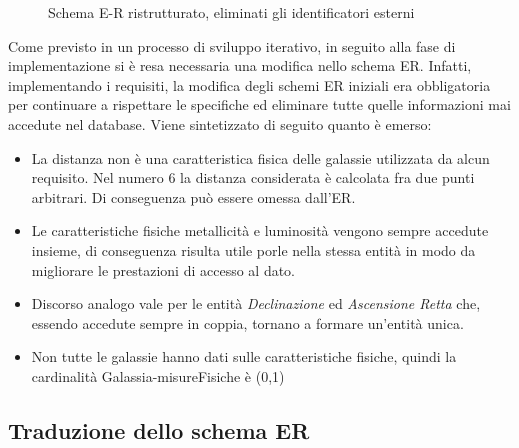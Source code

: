 \documentclass[12pt,a4paper,onecolumn,x11names]{article}
\begin{document}
\begin{figure}[h]
{
			}
			\caption{Schema E-R ristrutturato, eliminati gli identificatori esterni}
		\end{figure}

\newpage
		\begin{flushleft}
			Come previsto in un processo di sviluppo iterativo, in seguito alla fase di implementazione si è resa necessaria una modifica nello schema ER. \newline
			Infatti, implementando i requisiti, la modifica degli schemi ER iniziali era obbligatoria per continuare a rispettare le specifiche ed eliminare tutte quelle informazioni mai accedute nel database.
			Viene sintetizzato di seguito quanto è emerso:
			\begin{itemize}
				\item La distanza non è una caratteristica fisica delle galassie utilizzata da alcun requisito. Nel numero 6 la distanza considerata è calcolata fra due punti arbitrari. Di conseguenza può essere omessa dall'ER. 
				\item Le caratteristiche fisiche metallicità e luminosità vengono sempre accedute insieme, di conseguenza risulta utile porle nella stessa entità in modo da migliorare le prestazioni di accesso al dato.
				\item Discorso analogo vale per le entità \textit{Declinazione} ed \textit{Ascensione Retta} che, essendo accedute sempre in coppia, tornano a formare un'entità unica.
				\item Non tutte le galassie hanno dati sulle caratteristiche fisiche, quindi la cardinalità Galassia-misureFisiche è (0,1)
			\end{itemize}
		\end{flushleft}
\newpage

\subsection{Traduzione dello schema ER}
\end{document}

